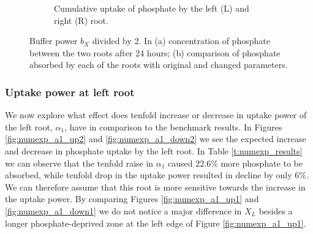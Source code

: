 \documentclass[11pt]{article}
\numberwithin{equation}{section}
\begin{document}
\begin{figure}[!htb]
\begin{subfigure}[t]{0.4\textwidth}
    \caption{Cumulative uptake of phosphate by the left (L) and right (R) root.}
    \label{fig:numexp_bxdown2}
\end{subfigure}
\caption{Buffer power $b_X$ divided by 2. In (a) concentration of phosphate between the two roots after 24 hours; (b) comparison of phosphate absorbed by each of the roots with original and changed parameters.}
\label{fig:numexp_bxdown}
\end{figure}

\subsubsection{Uptake power at left root}
\label{sec:numexp_a1}
We now explore what effect does tenfold increase or decrease in uptake power of the left root, $\alpha_1$, have in comparison to the benchmark results. In Figures \ref{fig:numexp_a1_up2} and \ref{fig:numexp_a1_down2} we see the expected increase and decrease in phosphate uptake by the left root. In Table \ref{t:numexp_results} we can observe that the tenfold raise in $\alpha_1$ caused $22.6 \%$ more phosphate to be absorbed, while tenfold drop in the uptake power resulted in decline by only $6 \%$. We can therefore assume that this root is more sensitive towards the increase in the uptake power. By comparing Figures \ref{fig:numexp_a1_up1} and \ref{fig:numexp_a1_down1} we do not notice a major difference in $X_L$ besides a longer phosphate-deprived zone at the left edge of Figure \ref{fig:numexp_a1_up1}.
\end{document}
